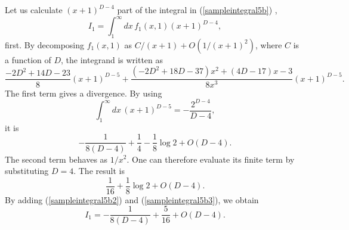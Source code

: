 \documentclass[preprint,amsmath,amssymb,superscriptaddress, floatfix,nofootinbib]{revtex4}
\begin{document}
Let us calculate $(x+1)^{D-4}$ part of the integral in  (\ref{sampleintegral5b}) , 
\begin{equation}
I_1 = \int_1^{\infty} dx \, f_1(x,1)(x+1)^{D-4} , 
\end{equation}
first. 
By decomposing $f_1(x,1)$ as 
$C/(x+1)+O(1/(x+1)^2)$, where $C$ is a function of $D$, the integrand is 
written as 
\begin{equation}
\frac{-2D^2+14D-23}{8}(x+1)^{D-5} + \frac{(-2D^2+18D-37)x^2+ (4D-17)x-3}{8x^3}
(x+1)^{D-5} . 
\label{sampleintegral5b1}
\end{equation}
The first term gives a divergence. By using 
\begin{equation}
\int_1^{\infty} dx \, (x+1)^{D-5} = -\frac{2^{D-4}}{D-4} ,
\end{equation}
it is
\begin{equation}
-\frac{1}{8(D-4)} +\frac{1}{4}-\frac{1}{8}\log 2 + O(D-4) .
\label{sampleintegral5b2}
\end{equation}
The second term behaves as $1/x^2$. One can therefore evaluate its finite term 
by substituting $D=4$.  The result is 
\begin{equation}
\frac{1}{16}+\frac{1}{8}\log 2 + O(D-4) . 
\label{sampleintegral5b3}
\end{equation}
By adding (\ref{sampleintegral5b2}) and (\ref{sampleintegral5b3}), we obtain 
\begin{equation}
I_1 = -\frac{1}{8(D-4)}+ \frac{5}{16} + O(D-4) .
\label{sampleintegral5c1}
\end{equation}
\end{document}
